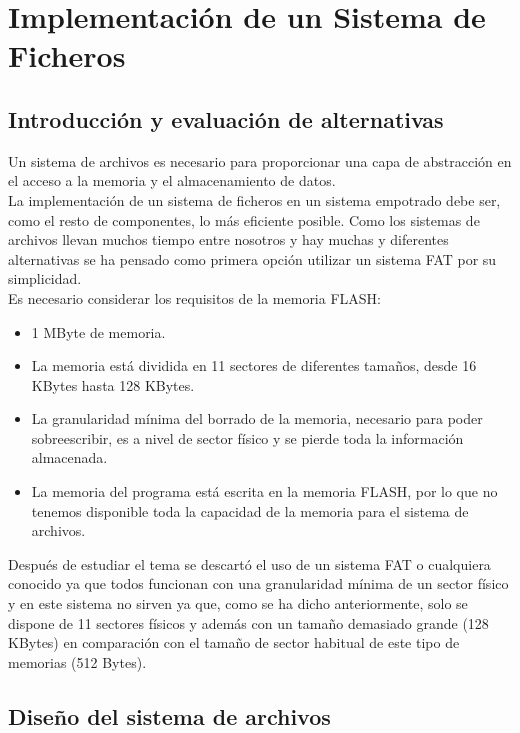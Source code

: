 \section{Implementación de un Sistema de Ficheros}
\label{obj5}

\subsection{Introducción y evaluación de alternativas}
Un sistema de archivos es necesario para proporcionar una capa de abstracción en el acceso a la memoria y el almacenamiento de datos. \\

La implementación de un sistema de ficheros en un sistema empotrado debe ser, como el resto de componentes, lo más eficiente posible. Como los sistemas de archivos llevan muchos tiempo entre nosotros y hay muchas y diferentes alternativas se ha pensado como primera opción utilizar un sistema FAT por su simplicidad.\\

Es necesario considerar los requisitos de la memoria FLASH:
\begin{itemize}
\item 1 MByte de memoria.
\item La memoria está dividida en 11 sectores de diferentes tamaños, desde 16 KBytes hasta 128 KBytes.
\item La granularidad mínima del borrado de la memoria, necesario para poder sobreescribir, es a nivel de sector físico y se pierde toda la información almacenada.
\item La memoria del programa está escrita en la memoria FLASH, por lo que no tenemos disponible toda la capacidad de la memoria para el sistema de archivos.\\
\end{itemize}

Después de estudiar el tema se descartó el uso de un sistema FAT o cualquiera conocido ya que todos funcionan con una granularidad mínima de un sector físico y en este sistema no sirven ya que, como se ha dicho anteriormente, solo se dispone de 11 sectores físicos y además con un tamaño demasiado grande (128 KBytes) en comparación con el tamaño de sector habitual de este tipo de memorias (512 Bytes).\\

\subsection{Diseño del sistema de archivos}

